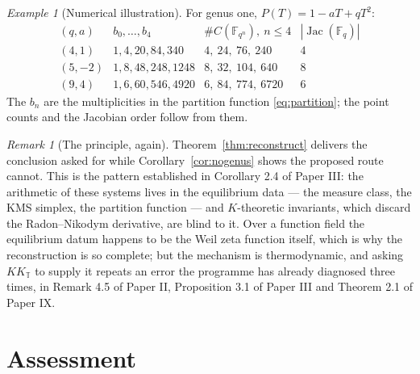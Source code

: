 \documentclass[11pt]{amsart}
\numberwithin{equation}{section}
\theoremstyle{definition}
\theoremstyle{remark}
\newtheorem{remark}[theorem]{Remark}
\newtheorem{example}[theorem]{Example}
\newcommand{\F}{\mathbb{F}}
\newcommand{\T}{\mathbb{T}}
\newcommand{\Jac}{\operatorname{Jac}}
\begin{document}
\begin{example}[Numerical illustration]\label{ex:elliptic}
For genus one, $P(T)=1-aT+qT^2$:
\[
\begin{array}{lccl}
(q,a) & b_0,\dots,b_4 & \#C(\F_{q^n}),\ n\le4 & |\Jac(\F_q)|\\\hline
(4,1) & 1,4,20,84,340 & 4,\ 24,\ 76,\ 240 & 4\\
(5,-2) & 1,8,48,248,1248 & 8,\ 32,\ 104,\ 640 & 8\\
(9,4) & 1,6,60,546,4920 & 6,\ 84,\ 774,\ 6720 & 6
\end{array}
\]
The $b_n$ are the multiplicities in the partition function \eqref{eq:partition}; the point
counts and the Jacobian order follow from them.
\end{example}

\begin{remark}[The principle, again]\label{rem:principle}
Theorem~\ref{thm:reconstruct} delivers the conclusion asked for while
Corollary~\ref{cor:nogenus} shows the proposed route cannot. This is the pattern established
in Corollary 2.4 of Paper III: the arithmetic of these systems lives in the equilibrium data
--- the measure class, the KMS simplex, the partition function --- and $K$-theoretic
invariants, which discard the Radon--Nikodym derivative, are blind to it. Over a function
field the equilibrium datum happens to be the Weil zeta function itself, which is why the
reconstruction is so complete; but the mechanism is thermodynamic, and asking $KK_\T$ to
supply it repeats an error the programme has already diagnosed three times, in
Remark 4.5 of Paper II, Proposition 3.1 of Paper III and Theorem 2.1 of Paper IX.
\end{remark}

\section{Assessment}
\end{document}
